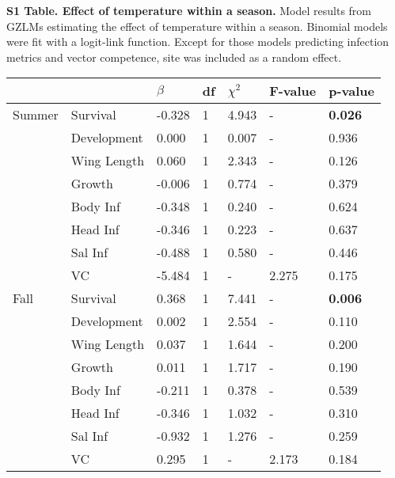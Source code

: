 \documentclass[12pt]{article}
\begin{document}
	\begin{table}[h]
\textbf{S1 Table. Effect of temperature within a season.} Model results from GZLMs estimating the effect of temperature within a season. Binomial models were fit with a logit-link function. Except for those models predicting infection metrics and vector competence, site was included as a random effect.

\centering
\begin{tabular}{lllllll}
\hline
       &             & \textbf{$\beta$} & \textbf{df} & \textbf{$\chi^2$} & \textbf{F-value} & \textbf{p-value} \\
\hline
Summer & Survival    & -0.328         & 1           & 4.943             & -                & \textbf{0.026}   \\
       & Development & 0.000          & 1           & 0.007             & -                & 0.936            \\
       & Wing Length & 0.060          & 1           & 2.343             & -                & 0.126            \\
       & Growth      & -0.006         & 1           & 0.774             & -                & 0.379            \\
       & Body Inf    & -0.348         & 1           & 0.240             & -                & 0.624            \\
       & Head Inf    & -0.346         & 1           & 0.223             & -                & 0.637            \\
       & Sal Inf     & -0.488         & 1           & 0.580             & -                & 0.446            \\
       & VC          & -5.484         & 1           & -                 & 2.275            & 0.175            \\
\hline
Fall   & Survival    & 0.368          & 1           & 7.441             & -                & \textbf{0.006}   \\
       & Development & 0.002          & 1           & 2.554             & -                & 0.110            \\
       & Wing Length & 0.037          & 1           & 1.644             & -                & 0.200            \\
       & Growth      & 0.011          & 1           & 1.717             & -                & 0.190            \\
       & Body Inf    & -0.211         & 1           & 0.378             & -                & 0.539            \\
       & Head Inf    & -0.346         & 1           & 1.032             & -                & 0.310            \\
       & Sal Inf     & -0.932         & 1           & 1.276             & -                & 0.259            \\
       & VC          & 0.295          & 1           & -                 & 2.173            & 0.184\\
\hline
\end{tabular}
	\end{table}
\end{document}
